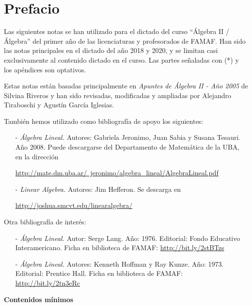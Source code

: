 \documentclass[a4paper,12pt,twoside,spanish]{amsbook}
\theoremstyle{definition}
\theoremstyle{remark}
\begin{document}
	\tableofcontents 
	
	
	\chapter*{Prefacio} 

	
	Las siguientes notas se han utilizado para el dictado del curso ``Álgebra II / Álgebra'' del primer año de las licenciaturas y profesorados de FAMAF. 	Han sido las notas principales en el dictado del año 2018 y 2020, y se limitan casi exclusivamente al contenido dictado en el curso. Las partes señaladas con (*) y los apéndices son optativos.
	
	Estas notas están basadas principalmente en \textit{Apuntes de Álgebra II - Año 2005} de Silvina Riveros y han sido revisadas, modificadas y ampliadas por Alejandro Tiraboschi  y Agustín García Iglesias. 
	
	También hemos utilizado como bibliografía de apoyo  los siguientes: 
	
	\begin{enumerate}
		\item [-] \textit{Álgebra Lineal.} Autores: Gabriela Jeronimo, Juan Sabia y Susana Tesauri. Año 2008. Puede descargarse del Departamento de Matemática de la UBA, en la dirección
		
		\href{http://mate.dm.uba.ar/~jeronimo/algebra_lineal/AlgebraLineal.pdf}	 {http://mate.dm.uba.ar/~jeronimo/algebra\_lineal/AlgebraLineal.pdf}
		\item [- ] \textit{Linear Algebra.} Autores: Jim Hefferon. Se descarga en
		
		\href{http://joshua.smcvt.edu/linearalgebra/}{http://joshua.smcvt.edu/linearalgebra/}
	\end{enumerate}
	
	
	Otra bibliografía de interés:
	\begin{enumerate}
		\item [-] \textit{Álgebra Lineal.}  Autor: Serge Lang. Año: 1976. Editorial: Fondo Educativo Interamericano. Ficha en biblioteca de FAMAF: \href{http://bit.ly/2stBTzs}{http://bit.ly/2stBTzs}
		\item [-] \textit{Álgebra Lineal.} Autores: Kenneth Hoffman y Ray Kunze.  Año: 1973. Editorial: Prentice Hall. Ficha en biblioteca de FAMAF:  \href{http://bit.ly/2tn3eRc}{http://bit.ly/2tn3eRc}
	\end{enumerate}
	
	\newpage
	\begin{center}
		\textbf{\large Contenidos mínimos}
	\end{center}
	
\end{document}
